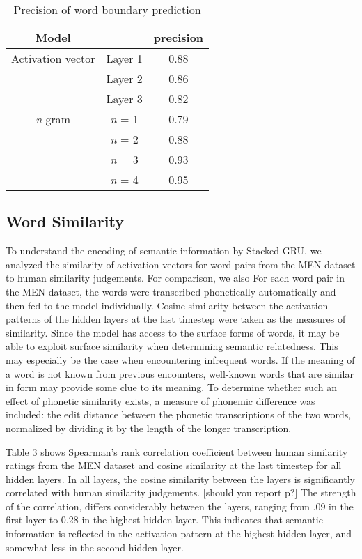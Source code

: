 \begin{table}[]
	\centering
	\begin{tabular}{ccc}
		Model & & precision \\
		\hline
		Activation vector & Layer 1 & 0.88 \\
		& Layer 2 & 0.86 \\
		& Layer 3 & 0.82 \\
		\hline
		\textit{n}-gram & \textit{n} = 1 & 0.79 \\
		& \textit{n} = 2 & 0.88 \\
		& \textit{n} = 3 & 0.93 \\
		& \textit{n} = 4 & 0.95
	\end{tabular}
	\caption{Precision of word boundary prediction}
\end{table}

\subsection{Word Similarity} %
To understand the encoding of semantic information by {\sc Stacked GRU}, we analyzed the similarity of activation vectors for word pairs from the MEN dataset %
to human similarity judgements. For comparison, we also 
For each word pair in the MEN dataset, the words were transcribed phonetically automatically and then fed to the model individually. Cosine similarity between the activation patterns of the hidden layers at the last timestep were taken as the measures of similarity. %
Since the model has access to the surface forms of words, it may be able to exploit surface similarity when determining semantic relatedness. This may especially be the case when encountering infrequent words. If the meaning of a word is not known from previous encounters, well-known words that are similar in form may provide some clue to its meaning. To determine whether such an effect of phonetic similarity exists, a measure of phonemic difference was included: the edit distance between the phonetic transcriptions of the two words, normalized by dividing it by the length of the longer transcription.

Table 3 shows Spearman's rank correlation coefficient between human similarity ratings from the MEN dataset and cosine similarity at the last timestep for all hidden layers. In all layers, the cosine similarity between the layers is significantly correlated with human similarity judgements. [should you report p?] The strength of the correlation, differs considerably between the layers, ranging from .09 in the first layer to 0.28 in the highest hidden layer. This indicates that semantic information is reflected in the activation pattern at the highest hidden layer, and somewhat less in the second hidden layer. 

